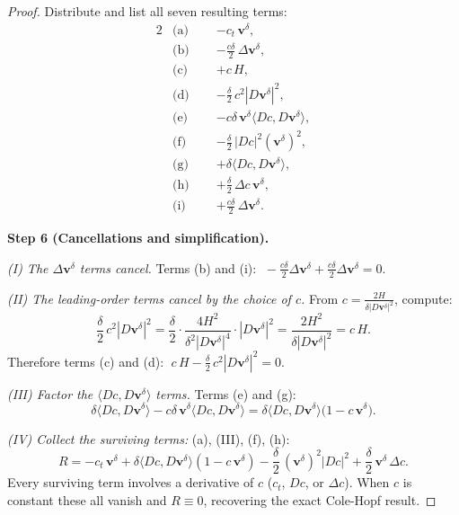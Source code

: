 \documentclass[11pt]{article}
\newcommand{\bv}{\bm{v}}
\begin{document}
\begin{proof}
Distribute and list all seven resulting terms:
\begin{alignat*}{2}
  &\text{(a)}\;\; &&{-c_t\,\bv^\delta}, \\
  &\text{(b)}\;\; &&{-\tfrac{c\delta}{2}\,\Delta\bv^\delta}, \\
  &\text{(c)}\;\; &&{+c\,H}, \\
  &\text{(d)}\;\; &&{-\tfrac{\delta}{2}\,c^2|D\bv^\delta|^2}, \\
  &\text{(e)}\;\; &&{-c\delta\,\bv^\delta\langle Dc, D\bv^\delta\rangle}, \\
  &\text{(f)}\;\; &&{-\tfrac{\delta}{2}\,|Dc|^2(\bv^\delta)^2}, \\
  &\text{(g)}\;\; &&{+\delta\langle Dc, D\bv^\delta\rangle}, \\
  &\text{(h)}\;\; &&{+\tfrac{\delta}{2}\,\Delta c\,\bv^\delta}, \\
  &\text{(i)}\;\; &&{+\tfrac{c\delta}{2}\,\Delta\bv^\delta}.
\end{alignat*}

\medskip
\noindent\textbf{Step 6 (Cancellations and simplification).}

\emph{(I) The $\Delta\bv^\delta$ terms cancel.}
Terms (b) and (i): $\;-\frac{c\delta}{2}\Delta\bv^\delta + \frac{c\delta}{2}\Delta\bv^\delta = 0$.

\emph{(II) The leading-order terms cancel by the choice of $c$.}
From $c = \frac{2H}{\delta|D\bv^\delta|^2}$, compute:
\[
  \frac{\delta}{2}\,c^2|D\bv^\delta|^2
  = \frac{\delta}{2}\cdot\frac{4H^2}{\delta^2|D\bv^\delta|^4}\cdot|D\bv^\delta|^2
  = \frac{2H^2}{\delta|D\bv^\delta|^2}
  = c\,H.
\]
Therefore terms (c) and (d): $\;c\,H - \frac{\delta}{2}\,c^2|D\bv^\delta|^2 = 0$.

\emph{(III) Factor the $\langle Dc, D\bv^\delta\rangle$ terms.}
Terms (e) and (g):
\[
  \delta\langle Dc, D\bv^\delta\rangle
  - c\delta\,\bv^\delta\langle Dc, D\bv^\delta\rangle
  = \delta\langle Dc, D\bv^\delta\rangle\bigl(1 - c\,\bv^\delta\bigr).
\]

\emph{(IV) Collect the surviving terms:} (a), (III), (f), (h):
\[
  \boxed{
    R = -c_t\,\bv^\delta
      + \delta\langle Dc, D\bv^\delta\rangle(1 - c\,\bv^\delta)
      - \frac{\delta}{2}\,(\bv^\delta)^2|Dc|^2
      + \frac{\delta}{2}\,\bv^\delta\,\Delta c.
  }
\]
Every surviving term involves a derivative of $c$ ($c_t$, $Dc$, or $\Delta c$).
When $c$ is constant these all vanish and $R\equiv 0$, recovering the exact
Cole-Hopf result.
\end{proof}
\end{document}
